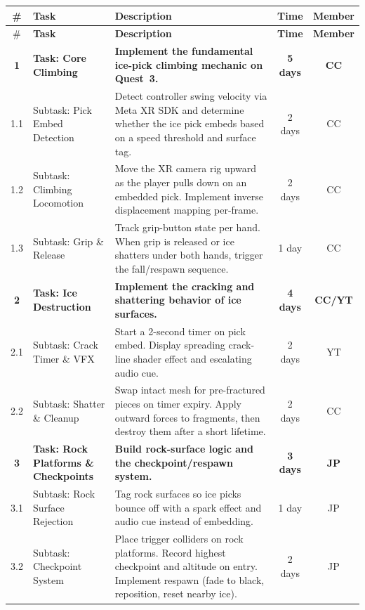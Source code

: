 \documentclass[12pt]{article}
\begin{document}
\renewcommand{\arraystretch}{1.4}
\setlength{\LTleft}{0pt}
\setlength{\LTright}{0pt}
\begin{longtable}{|c|p{2.8cm}|p{7.2cm}|c|c|}
\hline
 \# & \textbf{Task} & \textbf{Description} & \textbf{Time} & \textbf{Member} \\
\hline
\endfirsthead
\hline
 \# & \textbf{Task} & \textbf{Description} & \textbf{Time} & \textbf{Member} \\
\hline
\endhead
\hline
\endfoot
\textbf{1} & \textbf{Task: Core Climbing} & \textbf{Implement the fundamental ice-pick climbing mechanic on Quest~3.} & \textbf{5 days} & \textbf{CC} \\
\hline
1.1 & Subtask: Pick Embed Detection & Detect controller swing velocity via Meta XR SDK and determine whether the ice pick embeds based on a speed threshold and surface tag. & 2 days & CC \\
\hline
1.2 & Subtask: Climbing Locomotion & Move the XR camera rig upward as the player pulls down on an embedded pick. Implement inverse displacement mapping per-frame. & 2 days & CC \\
\hline
1.3 & Subtask: Grip \& Release & Track grip-button state per hand. When grip is released or ice shatters under both hands, trigger the fall/respawn sequence. & 1 day & CC \\
\hline
\textbf{2} & \textbf{Task: Ice Destruction} & \textbf{Implement the cracking and shattering behavior of ice surfaces.} & \textbf{4 days} & \textbf{CC/YT} \\
\hline
2.1 & Subtask: Crack Timer \& VFX & Start a 2-second timer on pick embed. Display spreading crack-line shader effect and escalating audio cue. & 2 days & YT \\
\hline
2.2 & Subtask: Shatter \& Cleanup & Swap intact mesh for pre-fractured pieces on timer expiry. Apply outward forces to fragments, then destroy them after a short lifetime. & 2 days & CC \\
\hline
\textbf{3} & \textbf{Task: Rock Platforms \& Checkpoints} & \textbf{Build rock-surface logic and the checkpoint/respawn system.} & \textbf{3 days} & \textbf{JP} \\
\hline
3.1 & Subtask: Rock Surface Rejection & Tag rock surfaces so ice picks bounce off with a spark effect and audio cue instead of embedding. & 1 day & JP \\
\hline
3.2 & Subtask: Checkpoint System & Place trigger colliders on rock platforms. Record highest checkpoint and altitude on entry. Implement respawn (fade to black, reposition, reset nearby ice). & 2 days & JP \\

\end{longtable}
\end{document}
